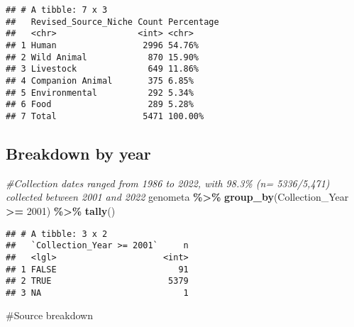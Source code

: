\documentclass[
]{article}
\newenvironment{Shaded}{\begin{snugshade}}{\end{snugshade}}
\newcommand{\CommentTok}[1]{\textcolor[rgb]{0.56,0.35,0.01}{\textit{#1}}}
\newcommand{\DecValTok}[1]{\textcolor[rgb]{0.00,0.00,0.81}{#1}}
\newcommand{\FunctionTok}[1]{\textcolor[rgb]{0.13,0.29,0.53}{\textbf{#1}}}
\newcommand{\NormalTok}[1]{#1}
\newcommand{\SpecialCharTok}[1]{\textcolor[rgb]{0.81,0.36,0.00}{\textbf{#1}}}
\begin{document}
\begin{verbatim}
## # A tibble: 7 x 3
##   Revised_Source_Niche Count Percentage
##   <chr>                <int> <chr>     
## 1 Human                 2996 54.76%    
## 2 Wild Animal            870 15.90%    
## 3 Livestock              649 11.86%    
## 4 Companion Animal       375 6.85%     
## 5 Environmental          292 5.34%     
## 6 Food                   289 5.28%     
## 7 Total                 5471 100.00%
\end{verbatim}

\hypertarget{breakdown-by-year}{%
\subsection{Breakdown by year}\label{breakdown-by-year}}

\begin{Shaded}
\begin{Highlighting}[]
\CommentTok{\#Collection dates ranged from 1986 to 2022, with 98.3\% (n= 5336/5,471) collected between 2001 and 2022}
\NormalTok{genometa }\SpecialCharTok{\%\textgreater{}\%} \FunctionTok{group\_by}\NormalTok{(Collection\_Year }\SpecialCharTok{\textgreater{}=} \DecValTok{2001}\NormalTok{) }\SpecialCharTok{\%\textgreater{}\%} \FunctionTok{tally}\NormalTok{()}
\end{Highlighting}
\end{Shaded}

\begin{verbatim}
## # A tibble: 3 x 2
##   `Collection_Year >= 2001`     n
##   <lgl>                     <int>
## 1 FALSE                        91
## 2 TRUE                       5379
## 3 NA                            1
\end{verbatim}

\#Source breakdown
\end{document}
